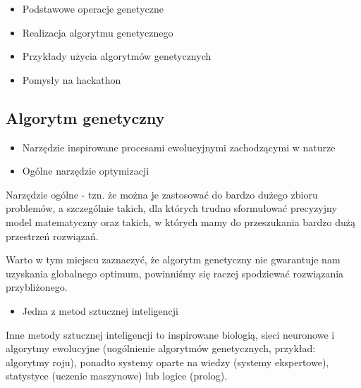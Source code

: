 \documentclass{article}
\begin{document}
    \begin{itemize}
\item
  Podstawowe operacje genetyczne
\end{itemize}

    \begin{itemize}
\item
  Realizacja algorytmu genetycznego
\end{itemize}

    \begin{itemize}
\item
  Przykłady użycia algorytmów genetycznych
\end{itemize}

    \begin{itemize}
\item
  Pomysły na hackathon
\end{itemize}

    \subsection{Algorytm genetyczny}

\begin{itemize}
\item
  Narzędzie inspirowane procesami ewolucyjnymi zachodzącymi w naturze
\end{itemize}

    \begin{itemize}
\item
  Ogólne narzędzie optymizacji
\end{itemize}

    Narzędzie ogólne - tzn. że można je zastosować do bardzo dużego zbioru
problemów, a szczególnie takich, dla których trudno sformułować
precyzyjny model matematyczny oraz takich, w których mamy do
przeszukania bardzo dużą przestrzeń rozwiązań.

Warto w tym miejscu zaznaczyć, że algorytm genetyczny nie gwarantuje nam
uzyskania globalnego optimum, powinniśmy się raczej spodziewać
rozwiązania przybliżonego.

    \begin{itemize}
\item
  Jedna z metod sztucznej inteligencji
\end{itemize}

    Inne metody sztucznej inteligencji to inspirowane biologią, sieci
neuronowe i algorytmy ewolucyjne (uogólnienie algorytmów genetycznych,
przykład: algorytmy roju), ponadto systemy oparte na wiedzy (systemy
ekspertowe), statystyce (uczenie maszynowe) lub logice (prolog).
\end{document}

